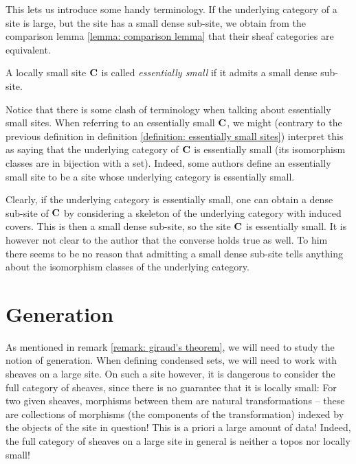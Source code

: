 This lets us introduce some handy terminology. If the underlying category of a site is large, but the site has a small dense sub-site, we obtain from the comparison lemma \ref{lemma: comparison lemma} that their sheaf categories are equivalent. 
\begin{definition}
	\label{definition: essentially small sites}
	
	A locally small site ${{\mathbf{C}}}$ is called \emph{essentially small} if it admits a small dense sub-site.
\end{definition}

\begin{remark}
	Notice that there is some clash of terminology when talking about essentially small sites. When referring to an essentially small ${{\mathbf{C}}}$, we might (contrary to the previous definition in definition \ref{definition: essentially small sites}) interpret this as saying that the underlying category of ${{\mathbf{C}}}$ is essentially small (\ie its isomorphism classes are in bijection with a set). Indeed, some authors define an essentially small site to be a site whose underlying category is essentially small.
	
	Clearly, if the underlying category is essentially small, one can obtain a dense sub-site of ${{\mathbf{C}}}$ by considering a skeleton of the underlying category with induced covers. This is then a small dense sub-site, so the site ${{\mathbf{C}}}$ is essentially small. It is however not clear to the author that the converse holds true as well. To him there seems to be no reason that admitting a small dense sub-site tells anything about the isomorphism classes of the underlying category.
\end{remark}


\section{Generation}
\label{section: generation}

As mentioned in remark \ref{remark: giraud's theorem}, we will need to study the notion of generation. When defining condensed sets, we will need to work with sheaves on a large site. On such a site however, it is dangerous to consider the full category of sheaves, since there is no guarantee that it is locally small: For two given sheaves, morphisms between them are natural transformations -- these are collections of morphisms (the components of the transformation) indexed by the objects of the site in question! This is a priori a large amount of data! Indeed, the full category of sheaves on a large site in general is neither a topos nor locally small!

